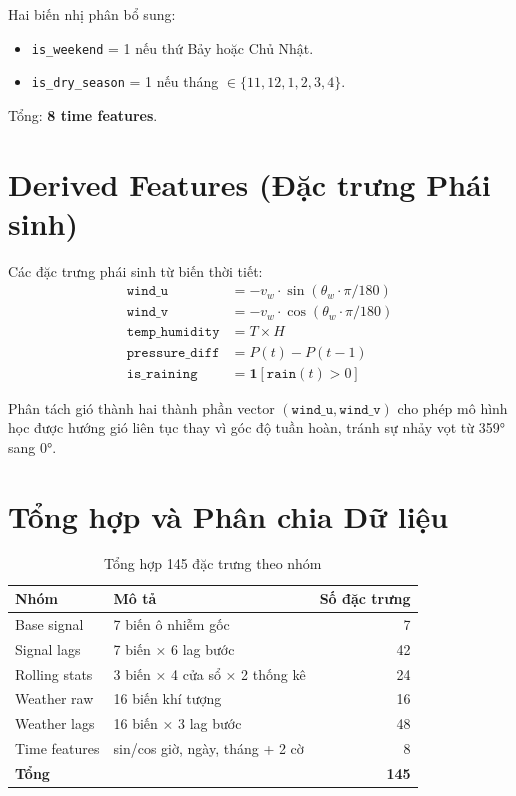 \documentclass[12pt,a4paper]{report}
\begin{document}
Hai biến nhị phân bổ sung:
\begin{itemize}
  \item \texttt{is\_weekend} = 1 nếu thứ Bảy hoặc Chủ Nhật.
  \item \texttt{is\_dry\_season} = 1 nếu tháng $\in \{11, 12, 1, 2, 3, 4\}$.
\end{itemize}

Tổng: \textbf{8 time features}.

\section{Derived Features (Đặc trưng Phái sinh)}

Các đặc trưng phái sinh từ biến thời tiết:
\begin{align}
  \texttt{wind\_u}       &= -v_w \cdot \sin(\theta_w \cdot \pi/180) \\
  \texttt{wind\_v}       &= -v_w \cdot \cos(\theta_w \cdot \pi/180) \\
  \texttt{temp\_humidity}&= T \times H \\
  \texttt{pressure\_diff}&= P(t) - P(t-1) \\
  \texttt{is\_raining}   &= \mathbf{1}[\texttt{rain}(t) > 0]
\end{align}

Phân tách gió thành hai thành phần vector $(\texttt{wind\_u}, \texttt{wind\_v})$ cho phép mô hình học được hướng gió liên tục thay vì góc độ tuần hoàn, tránh sự nhảy vọt từ 359° sang 0°.

\section{Tổng hợp và Phân chia Dữ liệu}

\begin{table}[H]
\centering
\caption{Tổng hợp 145 đặc trưng theo nhóm}
\label{tab:feature_summary}
\begin{tabular}{llr}
\toprule
\textbf{Nhóm} & \textbf{Mô tả} & \textbf{Số đặc trưng} \\
\midrule
Base signal     & 7 biến ô nhiễm gốc              & 7  \\
Signal lags     & 7 biến × 6 lag bước             & 42 \\
Rolling stats   & 3 biến × 4 cửa sổ × 2 thống kê  & 24 \\
Weather raw     & 16 biến khí tượng               & 16 \\
Weather lags    & 16 biến × 3 lag bước            & 48 \\
Time features   & sin/cos giờ, ngày, tháng + 2 cờ  & 8  \\
\midrule
\textbf{Tổng}   & & \textbf{145} \\
\bottomrule
\end{tabular}
\end{table}
\end{document}
